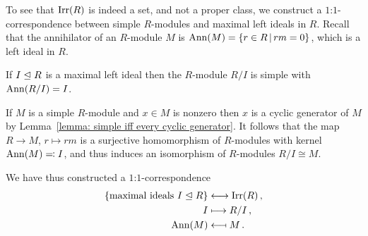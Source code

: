 \begin{remark}
  To see that $\operatorname{Irr}(R)$ is indeed a set, and not a proper class, we construct a $1$:$1$-correspondence between simple $R$-modules and maximal left ideals in $R$.
  Recall that the annihilator of an $R$-module $M$ is $\Ann(M) = \{r \in R \suchthat rm = 0\}$, which is a left ideal in $R$.
  
  If $I \trianglelefteq R$ is a maximal left ideal then the $R$-module $R/I$ is simple with $\operatorname{Ann}(R/I) = I$.
  
  If $M$ is a simple $R$-module and $x \in M$ is nonzero then $x$ is a cyclic generator of $M$ by Lemma~\ref{lemma: simple iff every cyclic generator}.
  It follows that the map $R \to M$, $r \mapsto rm$ is a surjective homomorphism of $R$-modules with kernel $\operatorname{Ann}(M) \eqqcolon I$, and thus induces an isomorphism of $R$-modules $R/I \cong M$.
  
  We have thus constructed a $1$:$1$-correspondence
  \begin{align*}
    \{ \text{maximal ideals $I \trianglelefteq R$} \}
    &\longleftrightarrow
    \operatorname{Irr}(R) \,, 
    \\
    I
    &\longmapsto
    R/I \,,
    \\
    \operatorname{Ann}(M)
    &\longmapsfrom
    M \,.
  \end{align*}
\end{remark}




